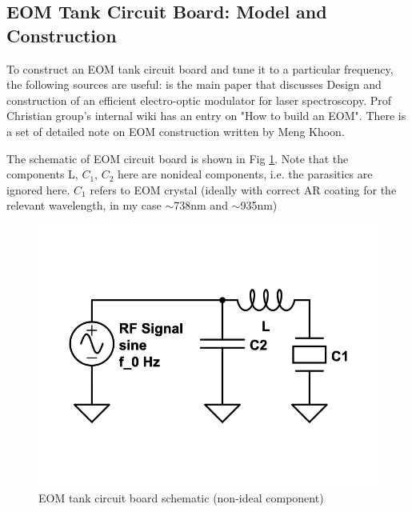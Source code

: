 \documentclass[12pt]{report}
\begin{document}
\subsection{EOM Tank Circuit Board: Model and Construction}
To construct an EOM tank circuit board and tune it to a particular frequency, the following sources are useful: \cite{20MHzEOM} is the main paper that discusses Design and construction of an efficient electro-optic modulator for laser spectroscopy. Prof Christian group's internal wiki has an entry on "How to build an EOM". There is a set of detailed note on EOM construction written by Meng Khoon. 
\par
The schematic of EOM circuit board is shown in Fig \ref{fig:eom-tank-cirucuit1}. Note that the components L, $C_1$, $C_2$ here are nonideal components, i.e. the parasitics are ignored here.
$C_1$ refers to EOM crystal (ideally with correct AR coating for the relevant wavelength, in my case $\sim$738nm and $\sim$935nm)

\begin{figure}[H]
    \centering
    \includegraphics[width=.5\textwidth]{eom-tank-cirucuit1.png}
    \caption{EOM tank circuit board schematic (non-ideal component)}
    \label{fig:eom-tank-cirucuit1}
\end{figure}
\end{document}
